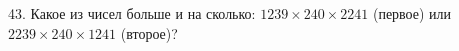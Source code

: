 43. Какое из чисел больше и на сколько: $1239\times240\times2241$ (первое) или $2239\times240\times1241$ (второе)?\\
